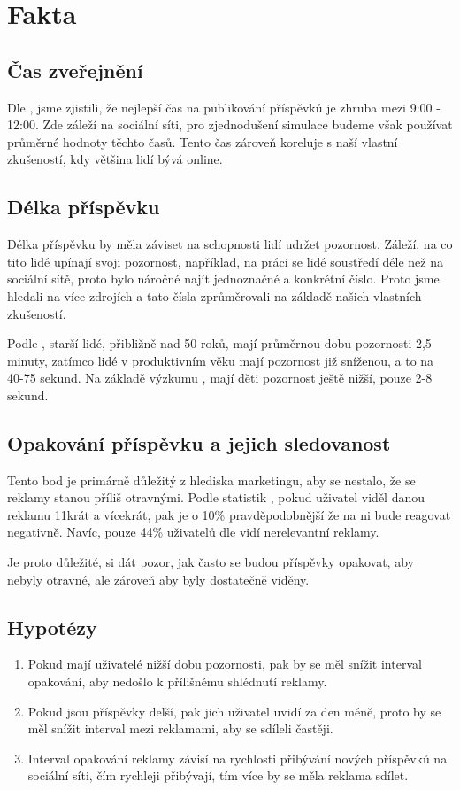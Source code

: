 \documentclass[11pt, a4paper]{article}
\begin{document}
\section{Fakta}

\subsection{Čas zveřejnění}
Dle \cite{TimeToPost}, jsme zjistili, že nejlepší čas na publikování příspěvků je zhruba mezi 9:00 - 12:00. Zde záleží na sociální síti, 
pro zjednodušení simulace budeme však používat průměrné hodnoty těchto časů.
Tento čas zároveň koreluje s naší vlastní zkušeností, kdy většina lidí bývá online.

\subsection{Délka příspěvku}
Délka příspěvku by měla záviset na schopnosti lidí udržet pozornost. Záleží, na co tito lidé upínají svoji pozornost,
například, na práci se lidé soustředí déle než na sociální sítě, proto bylo náročné najít jednoznačné a konkrétní číslo.
Proto jsme hledali na více zdrojích a tato čísla zprůměrovali na základě našich vlastních zkušeností.

Podle \cite{AttentionSpan1}, starší lidé, přibližně nad 50 roků, mají průměrnou dobu pozornosti 2,5 minuty, zatímco lidé v produktivním věku mají pozornost již sníženou, a to na 40-75 sekund.
Na základě výzkumu \cite{AttentionSpan2}, mají děti pozornost ještě nižší, pouze 2-8 sekund.

\subsection{Opakování příspěvku a jejich sledovanost}
Tento bod je primárně důležitý z hlediska marketingu, aby se nestalo, že se reklamy stanou příliš otravnými.
Podle statistik \cite{SocialMediaAds}, pokud uživatel viděl danou reklamu 11krát a vícekrát, pak je o 10\% pravděpodobnější že na ni bude reagovat negativně.
Navíc, pouze 44\% uživatelů dle \cite{SocialMediaAds-44} vidí nerelevantní reklamy. 

Je proto důležité, si dát pozor, jak často se budou příspěvky opakovat, aby nebyly otravné, ale zároveň aby byly dostatečně viděny.

\subsection{Hypotézy}
\begin{enumerate}
    \item Pokud mají uživatelé nižší dobu pozornosti, pak by se měl snížit interval opakování, aby nedošlo k přílišnému shlédnutí reklamy.
    \item Pokud jsou příspěvky delší, pak jich uživatel uvidí za den méně, proto by se měl snížit interval mezi reklamami, aby se sdíleli častěji.
    \item Interval opakování reklamy závisí na rychlosti přibývání nových příspěvků na sociální síti, čím rychleji přibývají, tím více by se měla reklama sdílet.
\end{enumerate}
\end{document}
